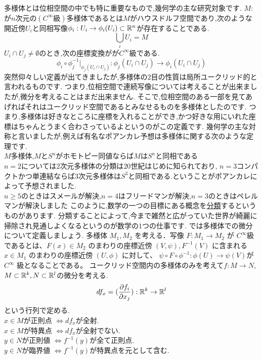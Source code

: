 多様体とは位相空間の中でも特に重要なもので,幾何学の主な研究対象です.
$M:$が$n$次元の$(C^\infty 級)$多様体であるとは$M$がハウスドルフ空間であり,次のような開近傍$U_i$と同相写像$\phi_i : U_i \to \phi_i(U_i) \subset \mathbb R^n$が存在することである.\\
\[ \bigcup_i U_i = M \]
$U_i \cap U_j \neq \emptyset$のとき,次の座標変換がが$C^\infty$級である.
\[
\phi_i \circ \phi_j^{-1} | _{\phi_j(U_i\cap U_j)} :\phi_j(U_i\cap U_j) \to \phi_i(U_i\cap U_j)
\]
突然仰々しい定義が出てきましたが,多様体の$2$目の性質は局所ユークリッド的と言われるものです.
つまり,位相空間で連続写像については考えることが出来ましたが,微分を考えることはまだ出来ません.
そこで,位相空間のある一部を見てあげればそれはユークリッド空間であるとみなせるものを多様体としたのです.
つまり,多様体は好きなところに座標を入れることができ,かつ好きな用にいれた座標はちゃんとうまく合わさっているよというのがこの定義です.
幾何学の主な対称と言いましたが,例えば有名なポアンカレ予想は多様体に関する次のような定理です.
\thm[ポアンカレ予想]
\leavevmode\\
$M$多様体,$M$と$S^n$がホモトピー同値ならば$M$は$S^n$と同相である\\
$n=2$については$2$次元多様体の分類は$20$世紀はじめに知られており,
$n=3$コンパクトかつ単連結ならば$3$次元多様体は$S^3$と同相である.ということがポアンカレによって予想されました.\\
$n\ge 5$のときはスメールが解決,$n = 4$はフリードマンが解決,$n=3$のときはペレルマンが解決しました
\thmx
このように,数学の一つの目標にある概念を\underline{分類}するというものがあります.
分類することによって,今まで雑然と広がっていた世界が綺麗に掃除され見通しよくなるというのが数学の$1$つの仕事です.
では多様体での微分について定義しましょう.
多様体 $M_1, M_2$ を考える．写像 $F : M_1 \to M_2$ が $C^\infty$級であるとは、$F(x) \in M_2$ のまわりの座標近傍 $(V,\psi), F^{-1}(V)$ に含まれる$x\in M_1$ のまわりの座標近傍 $(U, \phi)$ に対して、
$\psi \circ F \circ \phi^{-1} : \phi(U) \to \psi(V )$が $C^\infty$ 級となることである。
ユークリッド空間内の多様体のみを考えて$f:M\to N$,$M\subset\mathbb R^k,N\subset\mathbb R^l$の微分を考える.\\
\[
df_x = (\frac{\partial f_i}{\partial x_j}):\mathbb R^k\to\mathbb R^l
\]
という行列で定める.\\
$x\in M$が正則点 $\iff df_x$が全射.\\
$x\in M$が特異点 $\iff df_x$が全射でない.\\
$y\in N$が正則値 $\iff f^{-1}(y)$が全て正則点.\\
$y\in N$が臨界値 $\iff f^{-1}(y)$が特異点を元として含む.\\

